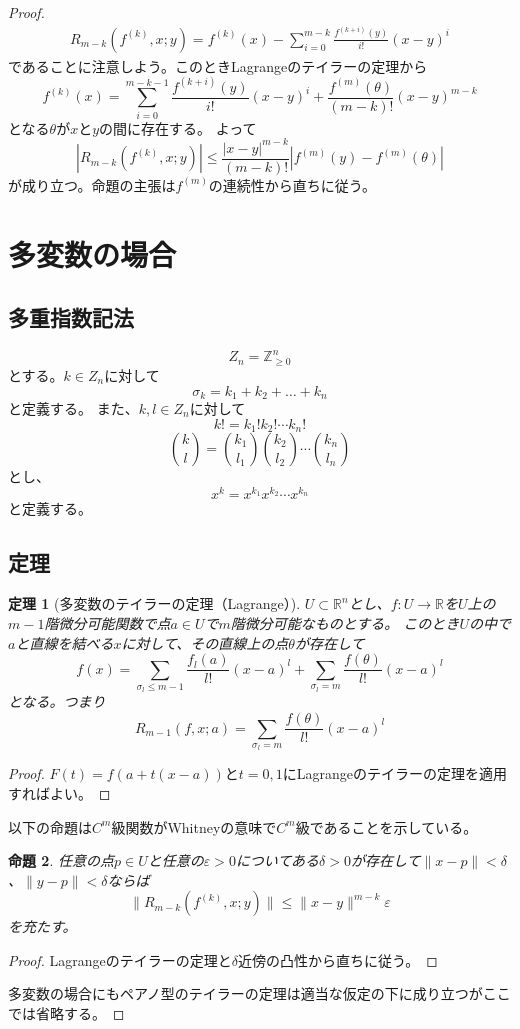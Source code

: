 \documentclass[leqno, a4paper, 12pt]{jsarticle}
\newtheorem{thm}{定理}
\newtheorem{prop}[thm]{命題}
\newcommand{\zz}{\mathbb{Z}}
\newcommand{\rr}{\mathbb{R}}
\newcommand{\ep}{\varepsilon}
\begin{document}
\begin{proof}
\begin{align*}
R_{m-k}(f^{(k)},x;y)=f^{(k)}(x)-\sum_{i=0}^{m-k}\frac{f^{(k+i)}(y)}{i!}(x-y)^i
\end{align*}
であることに注意しよう。このときLagrangeのテイラーの定理から
\[
f^{(k)}(x)=\sum_{i=0}^{m-k-1}\frac{f^{(k+i)}(y)}{i!}(x-y)^i+\frac{f^{(m)}(\theta)}{(m-k)!}(x-y)^{m-k}
\]
となる$\theta$が$x$と$y$の間に存在する。
よって
\[
|R_{m-k}(f^{(k)},x;y)|\le \frac{|x-y|^{m-k}}{(m-k)!}\left|f^{(m)}(y)-f^{(m)}(\theta)\right|
\]
が成り立つ。命題の主張は$f^{(m)}$の連続性から直ちに従う。




\section{多変数の場合}
\subsection{多重指数記法}
\[
Z_n=\zz_{\ge 0}^n
\]
とする。$k\in Z_n$に対して
\[
\sigma_k=k_1+k_2+\dots+k_n
\]
と定義する。
また、$k,l\in Z_n$に対して
\[
k!=k_1!k_2!\cdots k_n!
\]
\[
\binom{k}{l}=\binom{k_1}{l_1}\binom{k_2}{l_2}\cdots\binom{k_n}{l_n}
\]
とし、
\[
x^k=x^{k_1}x^{k_2}\cdots x^{k_n}
\]
と定義する。
\subsection{定理}

\begin{thm}[多変数のテイラーの定理（Lagrange）]
$U\subset \rr^n$とし、$f:U\to \rr$を$U$上の$m-1$階微分可能関数で点$a\in U$で$m$階微分可能なものとする。
このとき$U$の中で$a$と直線を結べる$x$に対して、その直線上の点$\theta$が存在して
\[
f(x)=\sum_{\sigma_l\le m-1}\frac{f_l(a)}{l!}(x-a)^l+\sum_{\sigma_l=m}\frac{f(\theta)}{l!}(x-a)^l
\]
となる。つまり
\[
R_{m-1}(f,x;a)=\sum_{\sigma_l=m}\frac{f(\theta)}{l!}(x-a)^l
\]
\end{thm}
\begin{proof}
$F(t)=f(a+t(x-a))$と$t=0,1$にLagrangeのテイラーの定理を適用すればよい。
\end{proof}

以下の命題は$C^m$級関数がWhitneyの意味で$C^m$級であることを示している。
\begin{prop}
任意の点$p\in U$と任意の$\ep>0$についてある$\delta>0$が存在して$\|x-p\|<\delta$、$\|y-p\|<\delta$ならば
\[
\|R_{m-k}(f^{(k)},x;y)\|\le \|x-y\|^{m-k}\ep
\]
を充たす。
\end{prop}
\begin{proof}
Lagrangeのテイラーの定理と$\delta$近傍の凸性から直ちに従う。
\end{proof}


多変数の場合にもペアノ型のテイラーの定理は適当な仮定の下に成り立つがここでは省略する。




\end{proof}
\end{document}
